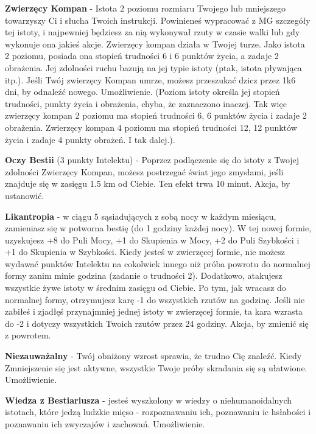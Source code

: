 \textbf{Zwierzęcy Kompan}\label{sec:Zwierzęcy Kompan} - Istota 2 poziomu rozmiaru Twojego lub mniejszego towarzyszy Ci i słucha Twoich instrukcji. Powinieneś wypracować z MG szczegóły tej istoty, i najpewniej będziesz za nią wykonywał rzuty w czasie walki lub gdy wykonuje ona jakieś akcje. Zwierzęcy kompan działa w Twojej turze. Jako istota 2 poziomu, posiada ona stopień trudności 6 i 6 punktów życia, a zadaje 2 obrażenia. Jej zdolności ruchu bazują na jej typie istoty (ptak, istota pływająca itp.). Jeśli Twój zwierzęcy Kompan umrze, możesz przeszukać dzicz przez 1k6 dni, by odnaleźć nowego. Umożliwienie. (Poziom istoty określa jej stopień trudności, punkty życia i obrażenia, chyba, że zaznaczono inaczej. Tak więc zwierzęcy kompan 2 poziomu ma stopień trudności 6, 6 punktów życia i zadaje 2 obrażenia. Zwierzęcy kompan 4 poziomu ma stopień trudności 12, 12 punktów życia i zadaje 4 punkty obrażeń. I tak dalej.).

\textbf{Oczy Bestii}\label{sec:Oczy Bestii} (3 punkty Intelektu) - Poprzez podlączenie się do istoty z Twojej zdolności Zwierzęcy Kompan, możesz postrzegać świat jego zmysłami, jeśli znajduje się w zasięgu 1.5 km od Ciebie. Ten efekt trwa 10 minut. Akcja, by ustanowić.

\textbf{Likantropia}\label{sec:Likantropia} - w ciągu 5 sąsiadujących z sobą nocy w każdym miesiącu, zamieniasz się w potworna bestię (do 1 godziny każdej nocy). W tej nowej formie, uzyskujesz +8 do Puli Mocy, +1 do Skupienia w Mocy, +2 do Puli Szybkości i +1 do Skupienia w Szybkości. Kiedy jesteś w zwierzęcej formie, nie możesz wydawać punktów Intelektu na cokolwiek innego niż próba powrotu do normalnej formy zanim minie godzina (zadanie o trudności 2). Dodatkowo, atakujesz wszystkie żywe istoty w średnim zasięgu od Ciebie. Po tym, jak wracasz do normalnej formy, otrzymujesz karę -1 do wszystkich rzutów na godzinę. Jeśli nie zabiłeś i zjadłęś przynajmniej jednej istoty w zwierzęcej formie, ta kara wzrasta do -2 i dotyczy wszystkich Twoich rzutów przez 24 godziny. Akcja, by zmienić się z powrotem.

\textbf{Niezauważalny}\label{sec:Niezauważalny}  - Twój obniżony wzrost sprawia, że trudno Cię znaleźć. Kiedy Zmniejszenie się jest aktywne, wszystkie Twoje próby skradania się są ułatwione. Umożliwienie.

\textbf{Wiedza z Bestiariusza}\label{sec:Wiedza z Bestiariusza} - jesteś wyszkolony w wiedzy o niehumanoidalnych istotach, które jedzą ludzkie mięso - rozpoznawaniu ich, poznawaniu ic hsłabości i poznawaniu ich zwyczajów i zachowań. Umożliwienie. 


